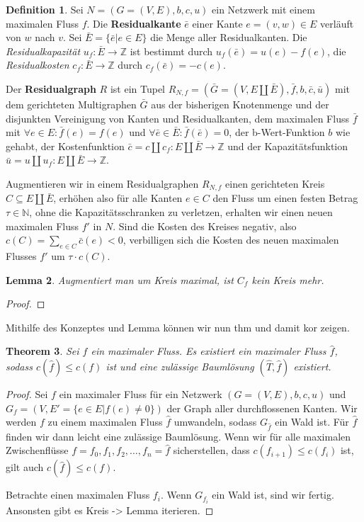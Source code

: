 \documentclass[a4paper,twoside,ngerman]{report}
\theoremstyle{plain}
\newtheorem{thm}{Theorem}
\newtheorem{lem}[thm]{Lemma}
\theoremstyle{definition}
\newtheorem{defn}[thm]{Definition}
\begin{document}
\begin{defn}Sei $N=(G=(V,E),b,c,u)$ ein Netzwerk mit einem maximalen Fluss $f$. Die \textbf{Residualkante} $\bar{e}$ einer Kante $e=(v,w)\in E$ verläuft von $w$ nach $v$. Sei $\bar{E}=\{\bar{e}|e\in E\}$ die Menge aller Residualkanten. Die \textit{Residualkapazität} $u_f:\bar{E}\rightarrow\mathbb{Z}$ ist bestimmt durch $u_f(\bar{e})=u(e)-f(e)$, die \textit{Residualkosten} $c_f:\bar{E}\rightarrow\mathbb{Z}$ durch $c_f(\bar{e})=-c(e)$.

Der \textbf{Residualgraph} $R$ ist ein Tupel $R_{N,f}=(\bar{G}=(V,E\amalg\bar{E}),\bar{f},b,\bar{c},\bar{u})$ mit dem gerichteten Multigraphen $\bar{G}$ aus der bisherigen Knotenmenge und der disjunkten Vereinigung von Kanten und Residualkanten, dem maximalen Fluss $\bar{f}$ mit $\forall e\in E:\bar{f}(e)=f(e)$ und $\forall \bar{e}\in\bar{E}:\bar{f}(\bar{e})=0$, der b-Wert-Funktion $b$ wie gehabt, der Kostenfunktion $\bar{c}=c\amalg c_f:E\amalg\bar{E}\rightarrow\mathbb{Z}$ und der Kapazitätsfunktion $\bar{u}=u\amalg u_f:E\amalg\bar{E}\rightarrow\mathbb{Z}$. 
\end{defn}

Augmentieren wir in einem Residualgraphen $R_{N,f}$ einen gerichteten Kreis $C\subseteq E\amalg\bar{E}$, erhöhen also für alle Kanten $e\in C$ den Fluss um einen festen Betrag $\tau\in\mathbb{N}$, ohne die Kapazitätsschranken zu verletzen, erhalten wir einen neuen maximalen Fluss $f'$ in $N$. Sind die Kosten des Kreises negativ, also $c(C)=\sum_{e\in C} \bar{c}(e) < 0$, verbilligen sich die Kosten des neuen maximalen Flusses $f'$ um $\tau\cdot c(C)$.

\begin{lem}Augmentiert man um Kreis maximal, ist $C_f$ kein Kreis mehr.
\end{lem}
\begin{proof}
\end{proof}

Mithilfe des Konzeptes und Lemma können wir nun thm und damit kor zeigen.

\begin{thm}Sei $f$ ein maximaler Fluss. Es existiert ein maximaler Fluss $\hat{f}$, sodass $c(\hat{f})\leq c(f)$ ist und eine zulässige Baumlösung $(\hat{T},\hat{f})$ existiert.\end{thm}
\begin{proof}Sei $f$ ein maximaler Fluss für ein Netzwerk $(G=(V,E),b,c,u)$ und $G_f=(V,E'=\{e\in E | f(e) \neq 0\})$ der Graph aller durchflossenen Kanten. Wir werden $f$ zu einem maximalen Fluss $\hat{f}$ umwandeln, sodass $G_{\hat{f}}$ ein Wald ist. Für $\hat{f}$ finden wir dann leicht eine zulässige Baumlösung. Wenn wir für alle maximalen Zwischenflüsse $f=f_0,f_1,f_2,\ldots,f_n=\hat{f}$ sicherstellen, dass $c(f_{i+1})\leq c(f_i)$ ist, gilt auch $c(\hat{f})\leq c(f)$.

Betrachte einen maximalen Fluss $f_i$. Wenn $G_{f_i}$ ein Wald ist, sind wir fertig. Ansonsten gibt es Kreis -> Lemma iterieren.
\end{proof}
\end{document}
